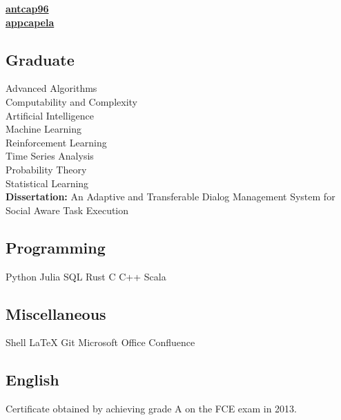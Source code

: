 \documentclass[a4paper]{MagicalCV}
\begin{document}
\begin{minipage}[t]{0.33\textwidth} 


 \href{https://github.com/antcap96}{\bf antcap96} \\
 \href{https://www.linkedin.com/in/appcapela/}{\bf appcapela}
\sectionsep


\subsection{Graduate}
Advanced Algorithms \\
Computability and Complexity \\
Artificial Intelligence \\
Machine Learning \\
Reinforcement Learning \\
Time Series Analysis \\
Probability Theory \\
Statistical Learning \\
\textbf{Dissertation: }
An Adaptive and Transferable Dialog Management System for Social Aware Task Execution \cite{capela2019adaptive}
\sectionsep


\subsection{Programming}
Python \textbullet{}
Julia \textbullet{}
SQL \textbullet{}
Rust \textbullet{}
C \textbullet{}
C++ \textbullet{}
Scala
\sectionsep
\subsection{Miscellaneous}
Shell \textbullet{}
LaTeX \textbullet{}
Git \textbullet{}
Microsoft Office \textbullet{}
Confluence


\subsection{English}
\vspace{\topsep} %
Certificate obtained by achieving grade A on the FCE exam in 2013.
\sectionsep


\end{minipage}
\end{document}
